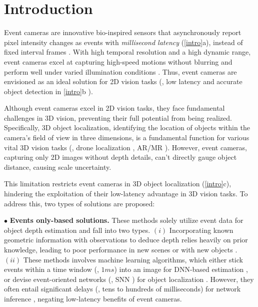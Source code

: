 \vspace{-0.5cm} 
\section{Introduction}

Event cameras are innovative bio-inspired sensors that asynchronously report pixel intensity changes as events with \textit{millisecond latency} (\fig \ref{intro}a), instead of fixed interval frames \cite{he2024microsaccade, gehrig2024low}.  
With high temporal resolution and a high dynamic range, event cameras excel at capturing high-speed motions without blurring and perform well under varied illumination conditions \cite{falanga2020dynamic, xu2023taming}.
Thus, event cameras are envisioned as an ideal solution for 2D vision tasks (\eg, low latency and accurate object detection in \fig \ref{intro}b \cite{gallego2020event}).

Although event cameras excel in 2D vision tasks, they face fundamental challenges in 3D vision, preventing their full potential from being realized.
Specifically, 3D object localization, identifying the location of objects within the camera's field of view in three dimensions, is a fundamental function for various vital 3D vision tasks (\eg, drone localization \cite{wang2022micnest}, AR/MR \cite{xu2021followupar}).
However, event cameras, capturing only 2D images without depth details, can't directly gauge object distance, causing scale uncertainty. 

This limitation restricts event cameras in 3D object localization (\fig \ref{intro}c), hindering the exploitation of their low-latency advantage in 3D vision tasks.
To address this, two types of solutions are proposed:


\noindent $\bullet$ \textbf{Events only-based solutions.}
These methods solely utilize event data for object depth estimation and fall into two types. 
$(i)$ Incorporating known geometric information with observations to deduce depth relies heavily on prior knowledge, leading to poor performance in new scenes or with new objects \cite{falanga2020dynamic}.
$(ii)$ These methods involves machine learning algorithms, which either stick events within a time window (\eg, $1ms$) into an image for DNN-based estimation \cite{guo2022low}, or devise event-oriented networks (\eg, SNN \cite{zhou2023computational}) for object localization \cite{barchid2023spiking}. 
However, they often entail significant delays (\eg, tens to hundreds of milliseconds) for network inference \cite{diehl2015unsupervised, guo2021toward}, negating low-latency benefits of event cameras.

